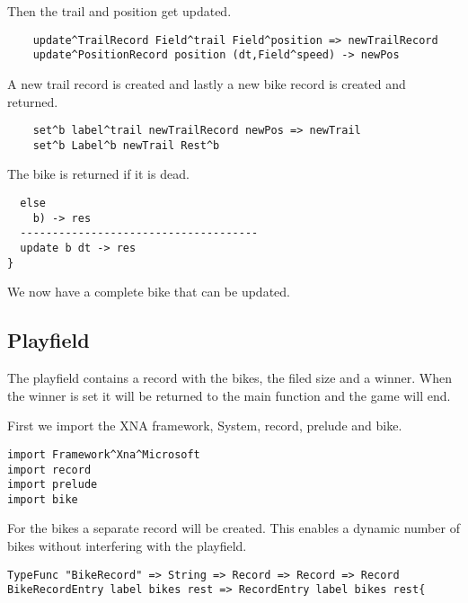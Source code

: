 Then the trail and position get updated.

\begin{lstlisting}
    update^TrailRecord Field^trail Field^position => newTrailRecord
    update^PositionRecord position (dt,Field^speed) -> newPos
\end{lstlisting}

A new trail record is created and lastly a new bike record is created and returned.

\begin{lstlisting}
    set^b label^trail newTrailRecord newPos => newTrail
    set^b Label^b newTrail Rest^b
\end{lstlisting}

The bike is returned if it is dead.

\begin{lstlisting}
  else
    b) -> res
  -------------------------------------
  update b dt -> res
}
\end{lstlisting}

We now have a complete bike that can be updated.




\subsection{Playfield}
The playfield contains a record with the bikes, the filed size and a winner.
When the winner is set it will be returned to the main function and the game will end.

First we import the XNA framework, System, record, prelude and bike.
\begin{lstlisting}
import Framework^Xna^Microsoft
import record
import prelude
import bike
\end{lstlisting}

For the bikes a separate record will be created.
This enables a dynamic number of bikes without interfering with the playfield.

\begin{lstlisting}
TypeFunc "BikeRecord" => String => Record => Record => Record
BikeRecordEntry label bikes rest => RecordEntry label bikes rest{
\end{lstlisting}

